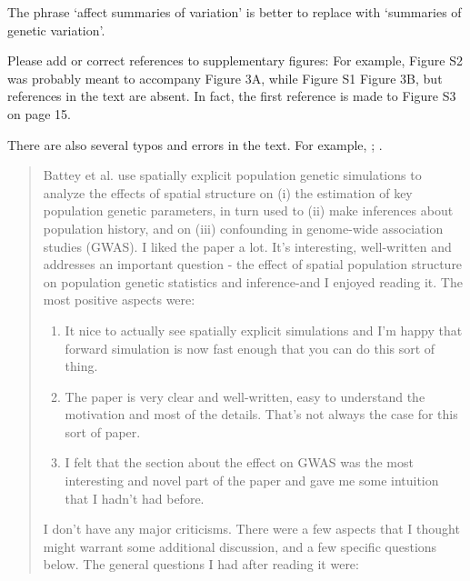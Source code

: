 \begin{point}{\revref}
    The phrase `affect summaries of variation' is better to replace with `summaries of genetic variation'.
\end{point}


\begin{point}{}
    Please add or correct references to supplementary figures: For example, Figure S2 was probably meant to accompany Figure 3A, while Figure S1 Figure 3B, but references in the text are absent. In fact, the first reference is made to Figure S3 on page 15.
\end{point}



\begin{point}{}
    There are also several typos and errors in the text. For example, \revref; .
\end{point}






\begin{quote}
    Battey et al. use spatially explicit population genetic simulations to
    analyze the effects of spatial structure on (i) the estimation of key
    population genetic parameters, in turn used to (ii) make inferences about
    population history, and on (iii) confounding in genome-wide association
    studies (GWAS). I liked the paper a lot. It's interesting, well-written and
    addresses an important question - the effect of spatial population
    structure on population genetic statistics and inference-and I enjoyed
    reading it. The most positive aspects were:

    \begin{enumerate}
        \item It nice to actually see spatially explicit simulations and I'm happy that forward simulation is now fast enough that you can do this sort of thing.
        \item The paper is very clear and well-written, easy to understand the motivation and most of the details. That's not always the case for this sort of paper.
        \item I felt that the section about the effect on GWAS was the most interesting and novel part of the paper and gave me some intuition that I hadn't had before.
    \end{enumerate}

    I don't have any major criticisms. There were a few aspects that I thought might warrant some additional discussion, and a few specific questions below. The general questions I had after reading it were:
\end{quote}

